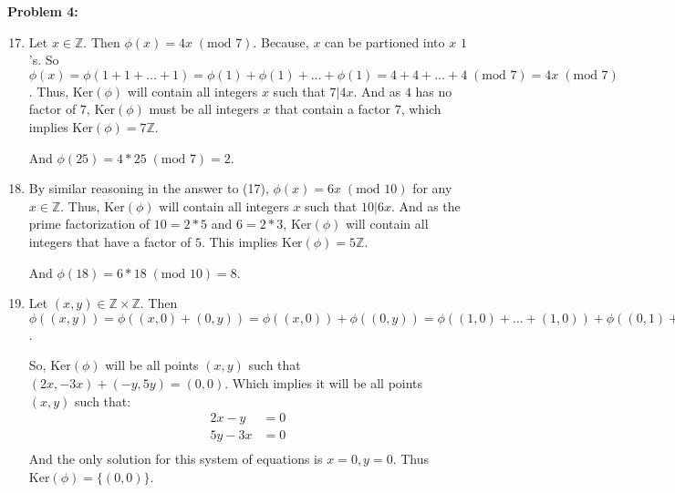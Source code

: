 \documentclass[12pt, letterpaper]{article}
\newenvironment{problem}
    [1]
    {\noindent \textbf{Problem #1:}}
    {\vspace{3mm}}
\begin{document}
\begin{problem}{4}
    \begin{enumerate}
        \setcounter{enumi}{16}

        \item Let $x \in \mathbb{Z}$. Then $\phi(x) = 4x \;(\text{mod } 7)$. Because, $x$ can be 
        partioned into $x$ $1$'s. So $\phi(x) = \phi(1 + 1 + \ldots + 1) = \phi(1) + \phi(1) + 
        \ldots + \phi(1) = 4 + 4 + \ldots + 4 \;(\text{mod } 7) = 4x \;(\text{mod } 7)$. Thus,
        $\text{Ker}(\phi)$ will contain all integers $x$ such that $7 | 4x$. And as $4$ has no 
        factor of $7$, $\text{Ker}(\phi)$ must be all integers $x$ that contain a factor $7$,
        which implies $\text{Ker}(\phi) = 7\mathbb{Z}$.

        \bigskip\noindent
        And $\phi(25) = 4*25 \; (\text{mod } 7) = 2$.

        \item By similar reasoning in the answer to (17), $\phi(x) = 6x \;(\text{mod } 10)$ for any $x \in \mathbb{Z}$.
        Thus, $\text{Ker}(\phi)$ will contain all integers $x$ such that $10 | 6x$. And as the prime
        factorization of $10 = 2 * 5$ and $6 = 2 * 3$, $\text{Ker}(\phi)$ will contain all integers 
        that have a factor of $5$. This implies $\text{Ker}(\phi) = 5\mathbb{Z}$.

        \bigskip\noindent
        And $\phi(18) = 6*18 \; (\text{mod } 10) = 8$.

        \setcounter{enumi}{22}

        \item Let $(x, y) \in \mathbb{Z} \times \mathbb{Z}$. Then $\phi((x, y)) = \phi((x, 0) + (0, y)) =
        \phi((x, 0)) + \phi((0, y)) = \phi((1, 0) + \ldots + (1, 0)) + \phi((0, 1) + \ldots + (0, 1)) = 
        \phi((1, 0)) + \ldots + \phi((1, 0)) + \phi((0, 1)) + \ldots + \phi((0, 1)) = (2, -3) + \ldots 
        (2, -3) + (-1, 5) + \ldots + (-1, 5) = (2x, -3x) + (-y, 5y)$.

        \bigskip\noindent
        So, $\text{Ker}(\phi)$ will be all points $(x, y)$ such that $(2x, -3x) + (-y, 5y) = (0, 0)$.
        Which implies it will be all points $(x, y)$ such that:
            \begin{align*}
                2x - y &= 0\\
                5y - 3x &= 0\\
            \end{align*}
        And the only solution for this system of equations is $x = 0, y = 0$. Thus $\text{Ker}(\phi) = 
        \{(0, 0)\}$.


\end{enumerate}
\end{problem}
\end{document}
